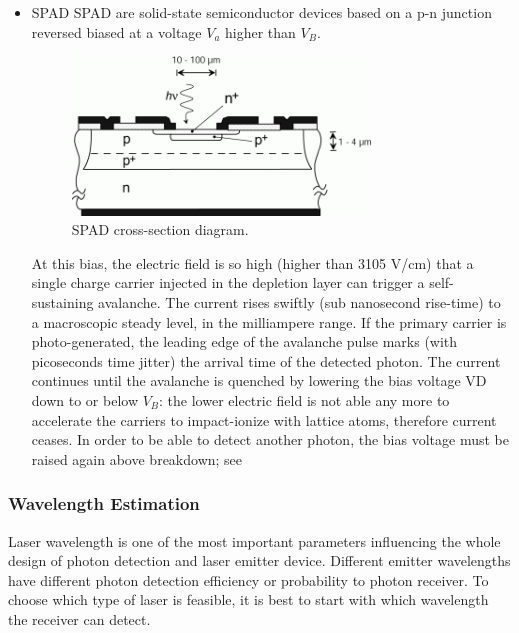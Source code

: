 \begin{itemize}
\item \acl{SPAD}
\acs{SPAD} are solid-state semiconductor devices based on a p-n junction reversed biased at a voltage $V_{a}$ higher than $V_{B}$.

\begin{figure}[ht!]
\centering
\includegraphics[width=0.75\textwidth]{chapters/img/SPAD_Cross-section.png}
\caption{\acs{SPAD} cross-section diagram.}
\label{fig:SPAD_cross-section}
\end{figure}

At this bias, the electric field is so high (higher than 3105 V/cm) that a single charge carrier injected in the depletion layer can trigger a self-sustaining avalanche. The current rises swiftly (sub nanosecond rise-time) to a macroscopic steady level, in the milliampere range. If the primary carrier is photo-generated, the leading edge of the avalanche pulse marks (with picoseconds time jitter) the arrival time of the detected photon. The current continues until the avalanche is quenched by lowering the bias voltage VD down to or below $V_{B}$: the lower electric field is not able any more to accelerate the carriers to impact-ionize with lattice atoms, therefore current ceases. In order to be able to detect another photon, the bias voltage must be raised again above breakdown; see \cite{SPAD_intro}

\end{itemize}

\subsubsection{Wavelength Estimation}
\label{introReceiver}
Laser wavelength is one of the most important parameters influencing the whole design of photon detection and \acs{laser} emitter device. Different emitter wavelengths have different photon detection efficiency or probability to photon receiver. To choose which type of \acs{laser} is feasible, it is best to start with which wavelength the receiver can detect.

